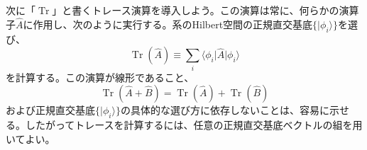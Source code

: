 \hypertarget{srcpage:35}{}\label{srcpage:35}
次に「$\operatorname{Tr}$」と書くトレース演算を導入しよう。この演算は常に、何らかの演算子$\hat A$に作用し、次のように実行する。系のHilbert空間の正規直交基底$\{\lvert\phi_i\rangle\}$を選び、
\begin{equation}\operatorname{Tr}(\hat A)\equiv\sum_i\langle\phi_i\rvert\hat A\lvert\phi_i\rangle\tag{2.14}\end{equation}
を計算する。この演算が線形であること、
\begin{equation}\operatorname{Tr}(\hat A+\hat B)=\operatorname{Tr}(\hat A)+\operatorname{Tr}(\hat B)\tag{2.15}\end{equation}
および正規直交基底$\{\lvert\phi_i\rangle\}$の具体的な選び方に依存しないことは、容易に示せる。したがってトレースを計算するには、任意の正規直交基底ベクトルの組を用いてよい。

